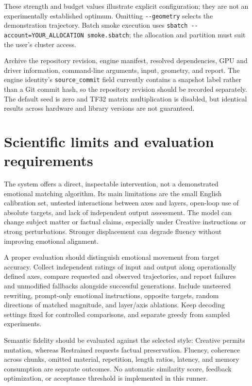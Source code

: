 \documentclass[manuscript,screen,nonacm]{acmart}
\begin{document}
These strength and budget values illustrate explicit configuration; they
are not an experimentally established optimum. Omitting
\nolinkurl{--geometry} selects the demonstration trajectory. Batch smoke
execution uses
\nolinkurl{sbatch --account=YOUR_ALLOCATION smoke.sbatch}; the
allocation and partition must suit the user's cluster access.

Archive the repository revision, engine manifest, resolved dependencies,
GPU and driver information, command-line arguments, input, geometry, and
report. The engine identity's \nolinkurl{source_commit} field currently
contains a snapshot label rather than a Git commit hash, so the
repository revision should be recorded separately. The default seed is
zero and TF32 matrix multiplication is disabled, but identical results
across hardware and library versions are not guaranteed.

\section{Scientific limits and evaluation
requirements}\label{scientific-limits-and-evaluation-requirements}

The system offers a direct, inspectable intervention, not a demonstrated
emotional matching algorithm. Its main limitations are the small English
calibration set, untested interactions between axes and layers,
open-loop use of absolute targets, and lack of independent output
assessment. The model can change subject matter or factual claims,
especially under Creative instructions or strong perturbations. Stronger
displacement can degrade fluency without improving emotional alignment.

A proper evaluation should distinguish emotional movement from target
accuracy. Collect independent ratings of input and output along
operationally defined axes, compare requested and observed trajectories,
and report failures and unmodified fallbacks alongside successful
generations. Include unsteered rewriting, prompt-only emotional
instructions, opposite targets, random directions of matched magnitude,
and layer/axis ablations. Keep decoding settings fixed for controlled
comparisons, and separate greedy from sampled experiments.

Semantic fidelity should be evaluated against the selected style:
Creative permits mutation, whereas Restrained requests factual
preservation. Fluency, coherence across chunks, omitted material,
repetition, length ratios, latency, and memory consumption are separate
outcomes. No automatic similarity score, feedback optimization, or
acceptance threshold is implemented in this runner.
\end{document}
